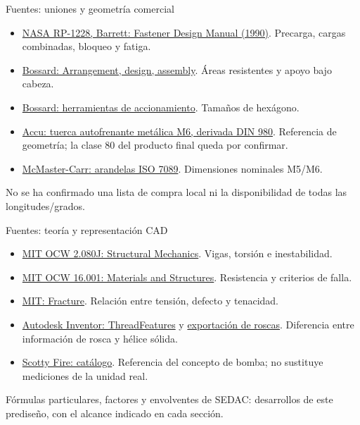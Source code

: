 \documentclass[10pt,aspectratio=169]{beamer}
\newcommand{\mcref}{Guía de diseño}
\begin{document}
\gdef\mcref{Guía de diseño}
\begin{frame}[t]{Fuentes: uniones y geometría comercial}

\small
\begin{itemize}
\item \href{https://ntrs.nasa.gov/api/citations/19900009424/downloads/19900009424.pdf}{NASA RP-1228, Barrett: Fastener Design Manual (1990)}. Precarga, cargas combinadas, bloqueo y fatiga.
\item \href{https://www.bossard.com/nl-en/-/media/bossard-group/website/documents/technical-resources/en/f-040-en.pdf}{Bossard: Arrangement, design, assembly}. Áreas resistentes y apoyo bajo cabeza.
\item \href{https://www.bossard.com/th-en/-/media/bossard-group/website/documents/technical-resources/en/f-077-en.pdf}{Bossard: herramientas de accionamiento}. Tamaños de hexágono.
\item \href{https://www.accu.co.uk/metal-locking-nuts/154970-HLN-M6-A2-BL}{Accu: tuerca autofrenante metálica M6, derivada DIN 980}. Referencia de geometría; la clase 80 del producto final queda por confirmar.
\item \href{https://www.mcmaster.com/products/washers/specifications-met~iso-7089/}{McMaster-Carr: arandelas ISO 7089}. Dimensiones nominales M5/M6.
\end{itemize}
No se ha confirmado una lista de compra local ni la disponibilidad de todas las longitudes/grados.

\end{frame}

\gdef\mcref{Guía de diseño}
\begin{frame}[t]{Fuentes: teoría y representación CAD}

\small
\begin{itemize}
\item \href{https://ocw.mit.edu/courses/2-080j-structural-mechanics-fall-2013/}{MIT OCW 2.080J: Structural Mechanics}. Vigas, torsión e inestabilidad.
\item \href{https://ocw.mit.edu/courses/16-001-unified-engineering-materials-and-structures-fall-2021/}{MIT OCW 16.001: Materials and Structures}. Resistencia y criterios de falla.
\item \href{https://web.mit.edu/course/3/3.11/www/modules/frac.pdf}{MIT: Fracture}. Relación entre tensión, defecto y tenacidad.
\item \href{https://help.autodesk.com/cloudhelp/2024/ENU/Inventor-API/files/ThreadFeatures.htm}{Autodesk Inventor: ThreadFeatures} y \href{https://www.autodesk.com/support/technical/article/caas/sfdcarticles/sfdcarticles/Threads-are-not-visible-in-STL-exported-from-Inventor.html}{exportación de roscas}. Diferencia entre información de rosca y hélice sólida.
\item \href{https://scottyfire.com/wp-content/uploads/2017/04/2017ScottyFireCatalogue_LR.pdf}{Scotty Fire: catálogo}. Referencia del concepto de bomba; no sustituye mediciones de la unidad real.
\end{itemize}
Fórmulas particulares, factores y envolventes de SEDAC: desarrollos de este prediseño, con el alcance indicado en cada sección.

\end{frame}
\end{document}
